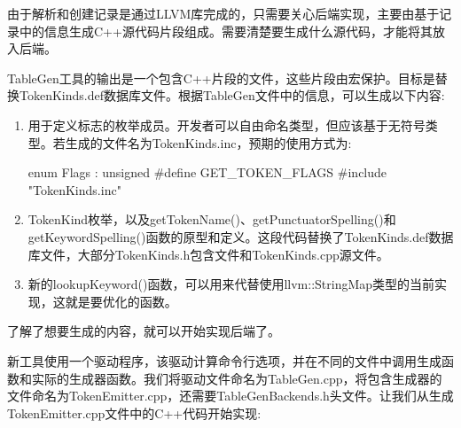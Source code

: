 由于解析和创建记录是通过LLVM库完成的，只需要关心后端实现，主要由基于记录中的信息生成C++源代码片段组成。需要清楚要生成什么源代码，才能将其放入后端。


TableGen工具的输出是一个包含C++片段的文件，这些片段由宏保护。目标是替换TokenKinds.def数据库文件。根据TableGen文件中的信息，可以生成以下内容:

\begin{enumerate}
\item
用于定义标志的枚举成员。开发者可以自由命名类型，但应该基于无符号类型。若生成的文件名为TokenKinds.inc，预期的使用方式为:

\begin{cpp}
enum Flags : unsigned {
    #define GET_TOKEN_FLAGS
    #include "TokenKinds.inc"
}
\end{cpp}

\item
TokenKind枚举，以及getTokenName()、getPunctuatorSpelling()和getKeywordSpelling()函数的原型和定义。这段代码替换了TokenKinds.def数据库文件，大部分TokenKinds.h包含文件和TokenKinds.cpp源文件。

\item
新的lookupKeyword()函数，可以用来代替使用llvm::StringMap类型的当前实现，这就是要优化的函数。
\end{enumerate}

了解了想要生成的内容，就可以开始实现后端了。


新工具使用一个驱动程序，该驱动计算命令行选项，并在不同的文件中调用生成函数和实际的生成器函数。我们将驱动文件命名为TableGen.cpp，将包含生成器的文件命名为TokenEmitter.cpp，还需要TableGenBackends.h头文件。让我们从生成TokenEmitter.cpp文件中的C++代码开始实现:

